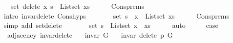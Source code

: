 \begin{isabellebody}
\ {\isachardoublequoteopen}{\isachardot}{\kern0pt}{\isachardot}{\kern0pt}{\isachardot}{\kern0pt}\ {\isacharequal}{\kern0pt}\ set\ {\isacharparenleft}{\kern0pt}delete\ x\ s{\isacharparenright}{\kern0pt}\ {\isacharminus}{\kern0pt}\ List{\isachardot}{\kern0pt}set\ xs{\isachardoublequoteclose}\isanewline
\ \ \ \ \isamarkupfalse%
\ Cons{\isachardot}{\kern0pt}prems\isanewline
\ \ \ \ \isamarkupfalse%
\ {\isacharparenleft}{\kern0pt}intro\ invar{\isacharunderscore}{\kern0pt}delete\ Cons{\isachardot}{\kern0pt}hyps{\isacharparenright}{\kern0pt}\isanewline
\ \ \isamarkupfalse%
\ \isamarkupfalse%
\ {\isachardoublequoteopen}{\isachardot}{\kern0pt}{\isachardot}{\kern0pt}{\isachardot}{\kern0pt}\ {\isacharequal}{\kern0pt}\ set\ s\ {\isacharminus}{\kern0pt}\ {\isacharbraceleft}{\kern0pt}x{\isacharbraceright}{\kern0pt}\ {\isacharminus}{\kern0pt}\ List{\isachardot}{\kern0pt}set\ xs{\isachardoublequoteclose}\isanewline
\ \ \ \ \isamarkupfalse%
\ Cons{\isachardot}{\kern0pt}prems\isanewline
\ \ \ \ \isamarkupfalse%
\ {\isacharparenleft}{\kern0pt}simp\ add{\isacharcolon}{\kern0pt}\ set{\isacharunderscore}{\kern0pt}delete{\isacharparenright}{\kern0pt}\isanewline
\ \ \isamarkupfalse%
\ \isamarkupfalse%
\ {\isachardoublequoteopen}{\isachardot}{\kern0pt}{\isachardot}{\kern0pt}{\isachardot}{\kern0pt}\ {\isacharequal}{\kern0pt}\ set\ s\ {\isacharminus}{\kern0pt}\ List{\isachardot}{\kern0pt}set\ {\isacharparenleft}{\kern0pt}x\ {\isacharhash}{\kern0pt}\ xs{\isacharparenright}{\kern0pt}{\isachardoublequoteclose}\isanewline
\ \ \ \ \isamarkupfalse%
\ auto\isanewline
\ \ \isamarkupfalse%
\ \isamarkupfalse%
\ {\isacharquery}{\kern0pt}case\isanewline
\ \ \ \ \isacommand{{\isachardot}{\kern0pt}}\isamarkupfalse%
\isanewline
{}\isamarkupfalse%
%
\endisatagproof
{\isafoldproof}%
%
\isadelimproof
\isanewline
%
\endisadelimproof
\isanewline
{}\isamarkupfalse%
\ {\isacharparenleft}{\kern0pt}\ adjacency{\isacharparenright}{\kern0pt}\ invar{\isacharunderscore}{\kern0pt}delete{\isacharunderscore}{\kern0pt}{}{\isacharcolon}{\kern0pt}\isanewline
\ \ \ {\isachardoublequoteopen}invar\ G{\isachardoublequoteclose}\isanewline
\ \ \ {\isachardoublequoteopen}invar\ {\isacharparenleft}{\kern0pt}delete{\isacharunderscore}{\kern0pt}{}\ p\ G{\isacharparenright}{\kern0pt}{\isachardoublequoteclose}\isanewline
%
\isadelimproof

\end{isabellebody}
